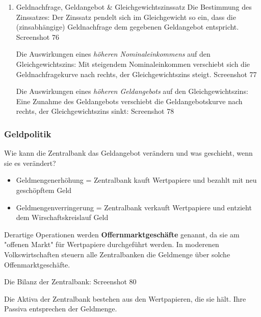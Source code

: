 \documentclass[11pt]{article}
\begin{document}
\begin{enumerate}
\item Geldnachfrage, Geldangebot \& Gleichgewichtszinssatz
\label{sec:org034edf2}
Die Bestimmung des Zinssatzes: Der Zinssatz pendelt sich im Gleichgewicht so ein, dass die (zinsabhängige) Geldnachfrage dem gegebenen Geldangebot entspricht. Screenshot 76

Die Auswirkungen eines \emph{höheren Nominaleinkommens} auf den Gleichgewichtszins: Mit steigendem Nominaleinkommen verschiebt sich die Geldnachfragekurve nach rechts, der Gleichgewichtszins steigt. Screenshot 77

Die Auswirkungen eines \emph{höheren Geldangebots} auf den Gleichgewichtszins: Eine Zunahme des Geldangebots verschiebt die Geldangebotskurve nach rechts, der Gleichgewichtszins sinkt: Screenshot 78
\end{enumerate}

\subsubsection{Geldpolitik}
\label{sec:orgbaf64e6}
Wie kann die Zentralbank das Geldangebot verändern und was geschieht, wenn sie es verändert?
\begin{itemize}
\item Geldmengenerhöhung = Zentralbank kauft Wertpapiere und bezahlt mit neu geschöpftem Geld
\item Geldmengenverringerung = Zentralbank verkauft Wertpapiere und entzieht dem Wirschaftskreislauf Geld
\end{itemize}

Derartige Operationen werden \textbf{Offernmarktgeschäfte} genannt, da sie am "offenen Markt" für Wertpapiere durchgeführt werden.
In moderenen Volkswirtschaften steuern alle Zentralbanken die Geldmenge über solche Offenmarktgeschäfte.

Die Bilanz der Zentralbank: Screenshot 80

Die Aktiva der Zentralbank bestehen aus den Wertpapieren, die sie hält. Ihre Passiva entsprechen der Geldmenge.
\end{document}
